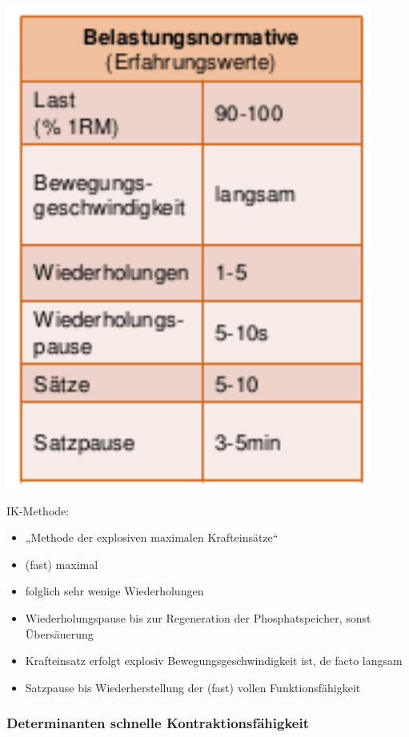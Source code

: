 \begin{minipage}{0.3\textwidth}
    \includegraphics[width=0.9\textwidth]{pictures/ik-methode}
\end{minipage}
\begin{minipage}{0.7\textwidth}
    IK-Methode:
    \begin{itemize}
        \item „Methode der explosiven maximalen Krafteinsätze“
        \item (fast) maximal
        \item folglich sehr wenige Wiederholungen
        \item Wiederholungspause bis zur Regeneration der Phosphatspeicher, sonst Übersäuerung
        \item Krafteinsatz erfolgt explosiv Bewegungsgeschwindigkeit ist, de facto langsam
        \item Satzpause bis Wiederherstellung der (fast) vollen Funktionsfähigkeit
    \end{itemize}
\end{minipage}

\subsubsection*{Determinanten schnelle Kontraktionsfähigkeit}

